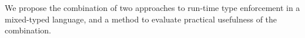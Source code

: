 We propose the combination of two approaches to run-time type enforcement in a
mixed-typed language, and a method to evaluate practical usefulness of the
combination.
